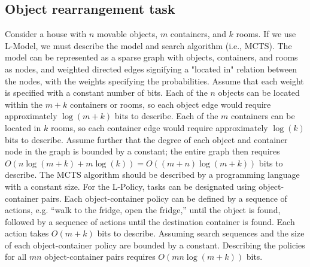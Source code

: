 \subsection{Object rearrangement task}

Consider a house with $n$ movable objects, $m$ containers, and $k$ rooms. If we use L-Model, we must describe the model and search algorithm (i.e., MCTS). The model can be represented as a sparse graph with objects, containers, and rooms as nodes, and weighted directed edges signifying a "located in" relation between the nodes, with the weights specifying the probabilities. Assume that each weight is specified with a constant number of bits. Each of the $n$ objects can be located within the $m+k$ containers or rooms, so each object edge would require approximately $\log(m+k)$ bits to describe. Each of the $m$ containers can be located in $k$ rooms, so each container edge would require approximately $\log(k)$ bits to describe. Assume further that the degree of each object and container node in the graph is bounded by a constant; the entire graph then requires $O(n\log(m+k)+m\log(k))=O((m+n)\log(m+k))$ bits to describe. The MCTS algorithm should be described by a programming language with a constant size. 
For the L-Policy, tasks can be designated using object-container pairs. Each object-container policy can be defined by a sequence of actions, e.g. ``walk to the fridge, open the fridge,'' until the object is found, followed by a sequence of actions until the destination container is found. Each action takes $O(m+k)$ bits to describe. Assuming search sequences and the size of each object-container policy are bounded by a constant. Describing the policies for all $mn$ object-container pairs requires $O(mn\log(m+k))$ bits. 


